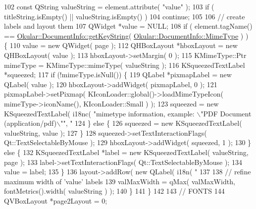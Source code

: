 \begin{DoxyCode}
{102         \textcolor{keyword}{const} QString valueString = element.attribute( \textcolor{stringliteral}{"value"} );
103         \textcolor{keywordflow}{if} ( titleString.isEmpty() || valueString.isEmpty() )
104             \textcolor{keywordflow}{continue};
105 
106         \textcolor{comment}{// create labels and layout them}
107         QWidget *value = NULL;
108         \textcolor{keywordflow}{if} ( element.tagName() == \hyperlink{classOkular_1_1DocumentInfo_a70cb5aa15e85e1690c7793ee9f4832b2}{Okular::DocumentInfo::getKeyString}( 
      \hyperlink{classOkular_1_1DocumentInfo_a3a6e5f7fb246e29bcb2e830b6f770791a786464e8e8c3e6ba1cd74e408487785b}{Okular::DocumentInfo::MimeType} ) ) \{
110             value = \textcolor{keyword}{new} QWidget( page );
112             QHBoxLayout *hboxLayout = \textcolor{keyword}{new} QHBoxLayout( value );
113             hboxLayout->setMargin( 0 );
115             KMimeType::Ptr mimeType = KMimeType::mimeType( valueString );
116             KSqueezedTextLabel *squeezed;
117             \textcolor{keywordflow}{if} (!mimeType.isNull()) \{
119                 QLabel *pixmapLabel = \textcolor{keyword}{new} QLabel( value );
120                 hboxLayout->addWidget( pixmapLabel, 0 );
121                 pixmapLabel->setPixmap( KIconLoader::global()->loadMimeTypeIcon( mimeType->iconName(), 
      KIconLoader::Small ) );
123                 squeezed = \textcolor{keyword}{new} KSqueezedTextLabel( i18nc( \textcolor{stringliteral}{"mimetype information, example: \(\backslash\)"PDF Document
       (application/pdf)\(\backslash\)""}, \textcolor{stringliteral}{"%
124             \} \textcolor{keywordflow}{else} \{
126                 squeezed = \textcolor{keyword}{new} KSqueezedTextLabel( valueString, value );
127             \}
128             squeezed->setTextInteractionFlags( Qt::TextSelectableByMouse );
129             hboxLayout->addWidget( squeezed, 1 );
130         \} \textcolor{keywordflow}{else} \{
132             KSqueezedTextLabel *label = \textcolor{keyword}{new} KSqueezedTextLabel( valueString, page );
133             label->setTextInteractionFlags( Qt::TextSelectableByMouse );
134             value = label;
135         \}
136         layout->addRow( \textcolor{keyword}{new} QLabel( i18n( \textcolor{stringliteral}{"%
137 
138         \textcolor{comment}{// refine maximum width of 'value' labels}
139         valMaxWidth = qMax( valMaxWidth, fontMetrics().width( valueString ) );
140     \}
141   \}
142 
143   \textcolor{comment}{// FONTS}
144   QVBoxLayout *page2Layout = 0;
}}}
\end{DoxyCode}

